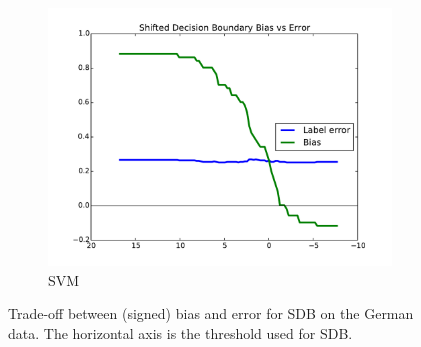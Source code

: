 \documentclass[twoside,leqno,twocolumn]{article}
\begin{document}
\begin{figure}[t]
\begin{subfigure}{.7\columnwidth}
\includegraphics[width=\columnwidth]{images/german-svmlinear-T.pdf}%
\caption{SVM}%
\label{fig:german_svm_tradeoff}%
\end{subfigure}%
\caption{Trade-off between (signed) bias and error for SDB on the German data. The horizontal axis is the threshold used for SDB.}
\label{fig:german_tradeoffs}
\end{figure}
\end{document}
